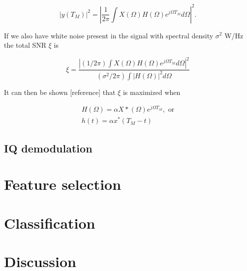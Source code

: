 \documentclass[a4paper, 12pt]{article}
\begin{document}
\begin{equation}
	|y(T_M)|^{2} = |\frac{1}{2\pi}\int X(\Omega)H(\Omega)e^{j\Omega T_M} d\Omega|^{2}.
\end{equation}

If we also have white noise present in the signal with spectral density $\sigma^2$ W/Hz the total SNR $\xi$ is 

\begin{equation}
	\xi = \frac{|(1/2\pi)\int X(\Omega)H(\Omega)e^{j\Omega T_M}d\Omega|^2}{(\sigma^2/2\pi)\int |H(\Omega)|^{2}d\Omega}
\end{equation}

It can then be shown [reference] that $\xi$ is maximized when

\begin{gather}
 H(\Omega) = \alpha X*(\Omega)e^{j\Omega T_M}, \text{ or} \\
h(t) = \alpha x^*(T_M - t)
\end{gather}

\subsection{IQ demodulation}



\section{Feature selection}

\section{Classification}

\section{Discussion}
\end{document}
